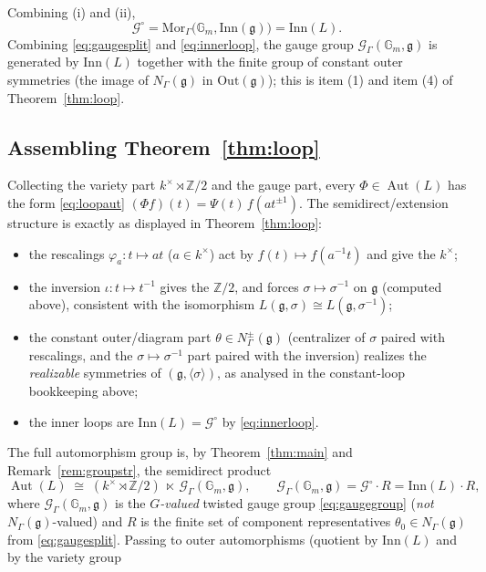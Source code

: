 \documentclass{amsart}
\theoremstyle{definition}
\DeclareMathOperator{\Aut}{Aut}
\newcommand{\Gm}{\mathbb{G}_m}
\newcommand{\g}{\mathfrak{g}}
\newcommand{\Z}{\mathbb{Z}}
\begin{document}
Combining (i) and (ii),
\begin{equation}\label{eq:innerloop}
\mathcal G^\circ=\mathrm{Mor}_\Gamma\bigl(\Gm,\mathrm{Inn}(\g)\bigr)
=\mathrm{Inn}(L).
\end{equation}
Combining \eqref{eq:gaugesplit} and \eqref{eq:innerloop}, the gauge group
$\mathcal G_\Gamma(\Gm,\g)$ is generated by $\mathrm{Inn}(L)$ together with
the finite group of constant outer symmetries (the image of $N_\Gamma(\g)$
in $\mathrm{Out}(\g)$); this is item (1) and item (4) of
Theorem~\ref{thm:loop}.

\subsection{Assembling Theorem~\ref{thm:loop}}
Collecting the variety part $k^\times\rtimes\Z/2$ and the gauge part, every
$\Phi\in\Aut(L)$ has the form \eqref{eq:loopaut}
$(\Phi f)(t)=\Psi(t)\,f(at^{\pm1})$.  The semidirect/extension structure is
exactly as displayed in Theorem~\ref{thm:loop}:
\begin{itemize}
\item the rescalings $\varphi_a:t\mapsto at$ ($a\in k^\times$) act by
$f(t)\mapsto f(a^{-1}t)$ and give the $k^\times$;
\item the inversion $\iota:t\mapsto t^{-1}$ gives the $\Z/2$, and forces
$\sigma\mapsto\sigma^{-1}$ on $\g$ (computed above), consistent with the
isomorphism $L(\g,\sigma)\cong L(\g,\sigma^{-1})$;
\item the constant outer/diagram part $\theta\in N^\pm_\Gamma(\g)$
(centralizer of $\sigma$ paired with rescalings, and the
$\sigma\mapsto\sigma^{-1}$ part paired with the inversion) realizes the
\emph{realizable} symmetries of $(\g,\langle\sigma\rangle)$, as analysed in
the constant-loop bookkeeping above;
\item the inner loops are $\mathrm{Inn}(L)=\mathcal G^\circ$ by
\eqref{eq:innerloop}.
\end{itemize}
The full automorphism group is, by Theorem~\ref{thm:main} and
Remark~\ref{rem:groupstr}, the semidirect product
\[
\Aut(L)\;\cong\;(k^\times\rtimes\Z/2)\ \ltimes\ \mathcal G_\Gamma(\Gm,\g),
\qquad
\mathcal G_\Gamma(\Gm,\g)=\mathcal G^\circ\cdot R
=\mathrm{Inn}(L)\cdot R,
\]
where $\mathcal G_\Gamma(\Gm,\g)$ is the \emph{$G$-valued} twisted gauge
group \eqref{eq:gaugegroup} (\emph{not} $N_\Gamma(\g)$-valued) and $R$ is the finite set of component representatives
$\theta_0\in N_\Gamma(\g)$ from \eqref{eq:gaugesplit}.  Passing to outer
automorphisms (quotient by $\mathrm{Inn}(L)$ and by the variety group
\end{document}
